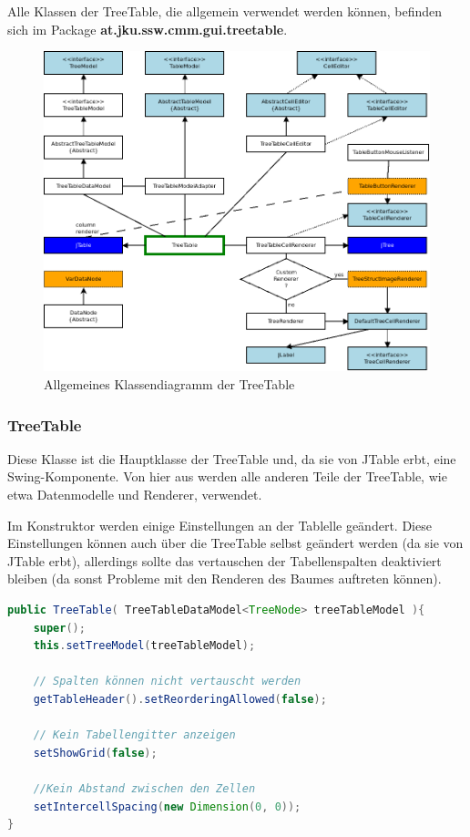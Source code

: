Alle Klassen der TreeTable, die allgemein verwendet werden können, befinden sich im Package \textbf{at.jku.ssw.cmm.gui.treetable}.

\begin{figure}
\includegraphics[width=\textwidth]{./media/images/gui/var/TreeTableClassesRaw.png}
\caption{Allgemeines Klassendiagramm der TreeTable}
\label{fig:deb-var-tt-class-raw}
\end{figure}

\subsubsection*{TreeTable}
Diese Klasse ist die Hauptklasse der TreeTable und, da sie von JTable erbt, eine Swing-Komponente. Von hier aus werden alle anderen Teile der TreeTable, wie etwa Datenmodelle und Renderer, verwendet.

Im Konstruktor werden einige Einstellungen an der Tablelle geändert. Diese Einstellungen können auch über die TreeTable selbst geändert werden (da sie von JTable erbt), allerdings sollte das vertauschen der Tabellenspalten deaktiviert bleiben (da sonst Probleme mit den Renderen des Baumes auftreten können).
\begin{lstlisting}[language=JAVA]
public TreeTable( TreeTableDataModel<TreeNode> treeTableModel ){
    super();
    this.setTreeModel(treeTableModel);
        
    // Spalten können nicht vertauscht werden
    getTableHeader().setReorderingAllowed(false);
        
    // Kein Tabellengitter anzeigen
    setShowGrid(false);
        
    //Kein Abstand zwischen den Zellen
	setIntercellSpacing(new Dimension(0, 0));
}
\end{lstlisting}

